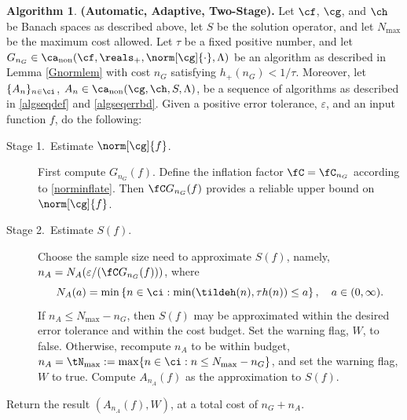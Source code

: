 \documentclass[]{elsarticle}
\DeclareMathOperator{\fix}{non}
\theoremstyle{definition}
\newtheorem{algo}{Algorithm}
\theoremstyle{remark}
\begin{document}
\begin{algo} \label{twostagedetalgo} {\bf (Automatic, Adaptive, Two-Stage).} Let $\cf$, $\cg$, and $\ch$ be Banach spaces as described above, let $S$ be the solution operator, and let $N_{\max}$ be the maximum cost allowed.  Let $\tau$ be a fixed positive number, and let $G_{n_G} \in \ca_{\fix}(\cf,\reals_+,\norm[\cg]{\cdot},\Lambda)$ be an algorithm as described in Lemma \ref{Gnormlem} with cost $n_G$ satisfying $h_{+}(n_G) < 1/\tau$.
Moreover, let  $\{A_n\}_{n \in \ci}$, $A_n  \in \ca_{\fix}(\cg,\ch,S,\Lambda)$, be a sequence of algorithms as described in \eqref{algseqdef} and \eqref{algseqerrbd}.  Given  a positive error tolerance, $\varepsilon$, and  an input function $f$, do the following:

\begin{description} 

\item[Stage 1.\ Estimate {$\norm[\cg]{f}$}.] First compute $G_{n_G}(f)$.  Define the inflation factor $\fC=\fC_{n_G}$ according to \eqref{norminflate}.
Then $\fC G_{n_G}(f)$ provides a reliable upper bound on $\norm[\cg]{f}$.  

\item [Stage 2.\ Estimate {$S(f)$}.] Choose the sample size need to approximate $S(f)$, namely, $n_A=N_{A}(\varepsilon/(\fC G_{n_G}(f)))$, where 
\begin{equation} \label{Nmindef}
N_{A}(a)= \min\left\{ n \in \ci : \min(\tildeh(n),\tau h(n)) \le a \right\}, \quad a \in (0,\infty).
\end{equation}
If $n_A \le N_{\max}-n_G$, then $S(f)$ may be approximated within the desired error tolerance and within the cost budget.  Set the warning flag, $W$, to false. Otherwise, recompute $n_A$ to be within budget, $n_A = \tN_{\max} := \max\{n \in \ci : n\le N_{\max} -  n_G\}$, and set the warning flag, $W$ to true.  Compute $A_{n_A}(f)$ as the approximation to $S(f)$.
\end{description}

Return the result $(A_{n_A}(f),W)$, at a total cost of $n_G+n_A$.  
\end{algo}
\end{document}
